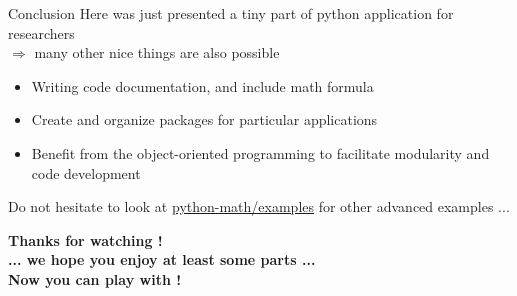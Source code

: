 \documentclass[11pt,unknownkeysallowed,usenames,dvipsnames]{beamer}
\begin{document}
\begin{frame}{Conclusion}
    Here was just presented a tiny part of python application for researchers\\
    $\Rightarrow$ many other nice things are also possible
    \begin{itemize}
        \item Writing code documentation, and include math formula
        \item Create and organize packages for particular applications
        \item Benefit from the object-oriented programming to facilitate modularity and code development
    \end{itemize}
    Do not hesitate to look at \href{https://gitlab.unige.ch/Thibaut.Lunet/python-math/tree/master/examples}{python-math/examples} for other advanced examples ...
    \begin{center}
        \bfseries
        Thanks for watching ! \\
        ... we hope you enjoy at least some parts ...
        \\ Now you can play with !
    \end{center}
\end{frame}
\end{document}
